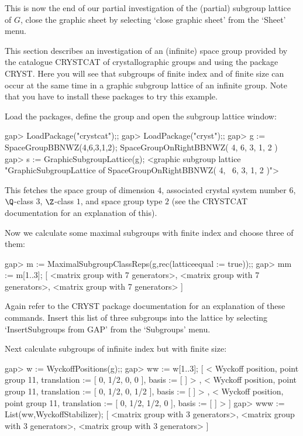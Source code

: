 This  is now  the end of   our partial investigation  of the (partial)
subgroup lattice  of $G$, close  the graphic sheet by selecting `close
graphic sheet' from the `Sheet' menu.



This section describes an investigation of an (infinite) space group
provided by the catalogue CRYSTCAT of crystallographic groups and
using the package CRYST. Here you will see that subgroups of
finite index and of finite size can occur at the same time in a
graphic subgroup lattice of an infinite group. Note that you have to
install these packages to try this example.

Load the packages, define the group and open the subgroup
lattice window: 

\begintt
gap> LoadPackage("crystcat");;
gap> LoadPackage("cryst");;
gap> g := SpaceGroupBBNWZ(4,6,3,1,2);
SpaceGroupOnRightBBNWZ( 4, 6, 3, 1, 2 )
gap> s := GraphicSubgroupLattice(g);
<graphic subgroup lattice "GraphicSubgroupLattice of SpaceGroupOnRightBBNWZ( 4, \
6, 3, 1, 2 )">
\endtt

This fetches the space group of dimension $4$, associated crystal
system number $6$, $\Q$-class 3, $\Z$-class $1$, and space group type
$2$ (see the CRYSTCAT documentation for an explanation of this).

Now we calculate some maximal subgroups with finite index and choose three of
them:

\begintt
gap> m := MaximalSubgroupClassReps(g,rec(latticeequal := true));;
gap> mm := m{[1..3]};
[ <matrix group with 7 generators>, <matrix group with 7 generators>, 
  <matrix group with 7 generators> ]
\endtt

Again refer to the CRYST package documentation for an
explanation of these commands. Insert this list of three subgroups
into the lattice by selecting `InsertSubgroups from GAP' from the
`Subgroups' menu.

Next calculate subgroups of infinite index but with finite size:

\begintt
gap> w := WyckoffPositions(g);;
gap> ww := w{[1..3]};
[ < Wyckoff position, point group 11, translation := [ 0, 1/2, 0, 0 ], 
    basis := [  ] >
    , < Wyckoff position, point group 11, translation := [ 0, 1/2, 0, 1/2 ], 
    basis := [  ] >
    , < Wyckoff position, point group 11, translation := [ 0, 1/2, 1/2, 0 ], 
    basis := [  ] >
     ]
gap> www := List(ww,WyckoffStabilizer);
[ <matrix group with 3 generators>, <matrix group with 3 generators>, 
  <matrix group with 3 generators> ]
\endtt

